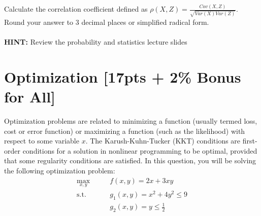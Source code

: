 \documentclass{article}
\begin{document}
\noindent Calculate the correlation coefficient defined as $\rho(X,Z)=\frac{Cov(X,Z)}{\sqrt{Var(X)Var(Z)}}$. Round your answer to 3 decimal places or simplified radical form.\\\\
\noindent\textbf{HINT:} Review the probability and statistics lecture slides\\


\newpage
\section{Optimization [17pts + 2\% Bonus for All]}
Optimization problems are related to minimizing a function (usually termed loss, cost or error function) or maximizing a function (such as the likelihood) with respect to some variable $x$. The Karush-Kuhn-Tucker (KKT) conditions are first-order conditions for a solution in nonlinear programming to be optimal, provided that some regularity conditions are satisfied. In this question, you will be solving the following optimization problem:
\begin{align*}
    \max_{x,y} \qquad & f(x,y) = 2x + 3xy \\
    \text{s.t.} \qquad & g_{1}(x,y) = x^{2}+4y^{2}\leq 9 \\
    & g_{2}(x,y) =  y \leq \frac{1}{2}
\end{align*}
\end{document}
